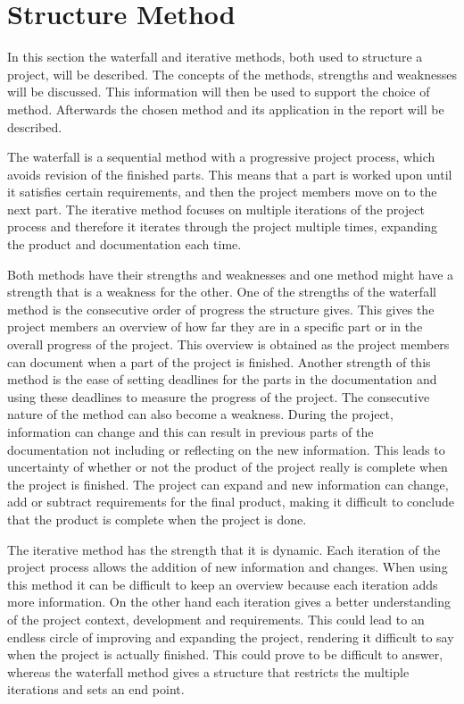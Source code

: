 \chapter*{Structure Method}
In this section the waterfall and iterative methods, both used to structure a project, will be described. The concepts of the methods, strengths and weaknesses will be discussed. This information will then be used to support the choice of method. Afterwards the chosen method and its application in the report will be described.

The waterfall is a sequential method with a progressive project process, which avoids revision of the finished parts. This means that a part is worked upon until it satisfies certain requirements, and then the project members move on to the next part. The iterative method focuses on multiple iterations of the project process and therefore it iterates through the project multiple times, expanding the product and documentation each time.

Both methods have their strengths and weaknesses and one method might have a strength that is a weakness for the other. One of the strengths of the waterfall method is the consecutive order of progress the structure gives. This gives the project members an overview of how far they are in a specific part or in the overall progress of the project. This overview is obtained as the project members can document when a part of the project is finished. Another strength of this method is the ease of setting deadlines for the parts in the documentation and using these deadlines to measure the progress of the project. The consecutive nature of the method can also become a weakness. During the project, information can change and this can result in previous parts of the documentation not including or reflecting on the new information. This leads to uncertainty of whether or not the product of the project really is complete when the project is finished. The project can expand and new information can change, add or subtract requirements for the final product, making it difficult to conclude that the product is complete when the project is done. 

The iterative method has the strength that it is dynamic. Each iteration of the project process allows the addition of new information and changes. When using this method it can be difficult to keep an overview because each iteration adds more information. On the other hand each iteration gives a better understanding of the project context, development and requirements. This could lead to an endless circle of improving and expanding the project, rendering it difficult to say when the project is actually finished. This could prove to be difficult to answer, whereas the waterfall method gives a structure that restricts the multiple iterations and sets an end point. 

